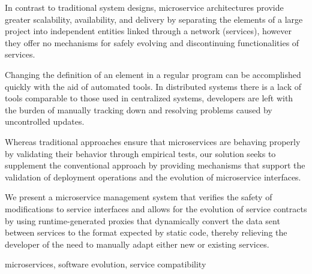 
%

In contrast to traditional system designs, microservice architectures provide greater
scalability, availability, and delivery by separating the elements of a large project into independent entities linked through a network (services), however they offer no
mechanisms for safely evolving and discontinuing functionalities of services.

Changing the definition of an element in a regular program can be accomplished quickly with the aid of automated tools.
In distributed systems there is a lack of tools comparable to those used in centralized systems,
developers are left with the burden of manually tracking down and resolving problems caused by uncontrolled updates.

Whereas traditional approaches ensure that microservices are behaving properly by validating their behavior through empirical tests,
our solution seeks to supplement the conventional approach by providing mechanisms that support the validation of deployment operations and the evolution of microservice interfaces.

We present a microservice management system that verifies the safety of modifications to service interfaces
and allows for the evolution of service contracts by using runtime-generated proxies that dynamically convert the data sent between services to the format expected by static code,
thereby relieving the developer of the need to manually adapt either new or existing services.

\begin{keywords}
    microservices, software evolution, service compatibility
\end{keywords} 
